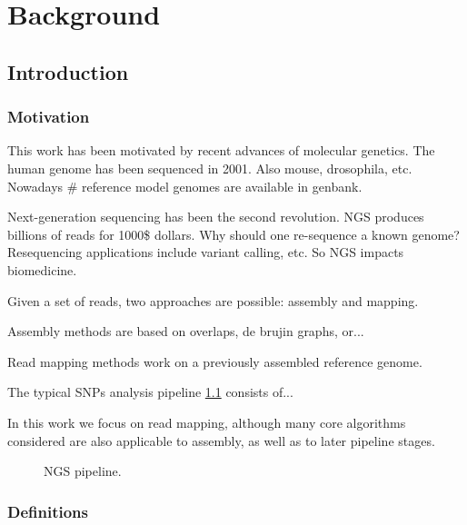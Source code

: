 \chapter{Background}


\section{Introduction}


\subsection{Motivation}

This work has been motivated by recent advances of molecular genetics.
The human genome has been sequenced in 2001. Also mouse, drosophila, etc.
Nowadays \# reference model genomes are available in genbank.

Next-generation sequencing has been the second revolution.
NGS produces billions of reads for 1000\$ dollars.
Why should one re-sequence a known genome?
Resequencing applications include variant calling, etc.
So NGS impacts biomedicine.

Given a set of reads, two approaches are possible: assembly and mapping.

Assembly methods are based on overlaps, de brujin graphs, or...

Read mapping methods work on a previously assembled reference genome.

The typical SNPs analysis pipeline \ref{fig:ngs-pipeline} consists of...

In this work we focus on read mapping, although many core algorithms considered are also applicable to assembly, as well as to later pipeline stages.

\begin{figure}[h]
\caption{NGS pipeline.}
\label{fig:ngs-pipeline}
\end{figure}


\subsection{Definitions}

